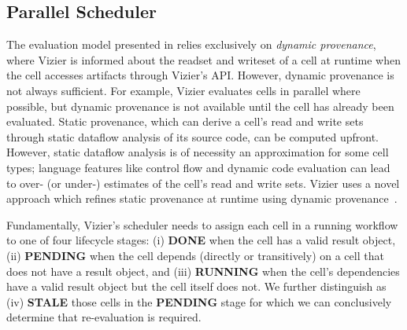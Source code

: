 \subsection{Parallel Scheduler}\label{sec:vizier-scheduler}

The evaluation model presented in  relies exclusively on \textit{dynamic provenance}, where Vizier is informed about the readset and writeset of a cell at runtime when the cell accesses artifacts through Vizier's API.
However, dynamic provenance is not always sufficient.
For example, Vizier evaluates cells in parallel where possible, but dynamic provenance is not available until the cell has already been evaluated.
Static provenance, which can derive a cell's read and write sets through static dataflow analysis of its source code, can be computed upfront.
However, static dataflow analysis is of necessity an approximation for some cell types; language features like control flow and dynamic code evaluation can lead to over- (or under-) estimates of the cell's read and write sets. %
Vizier uses a novel approach which refines static provenance at runtime using dynamic provenance~\cite{DG22}.

Fundamentally, Vizier's scheduler needs to assign each cell in a running workflow to one of four lifecycle stages: (i) \textbf{DONE} when the cell has a valid result object, (ii) \textbf{PENDING} when the cell depends (directly or transitively) on a cell that does not have a result object, and (iii) \textbf{RUNNING} when the cell's dependencies have a valid result object but the cell itself does not.
We further distinguish as (iv) \textbf{STALE} those cells in the \textbf{PENDING} stage for which we can conclusively determine that re-evaluation is required.

